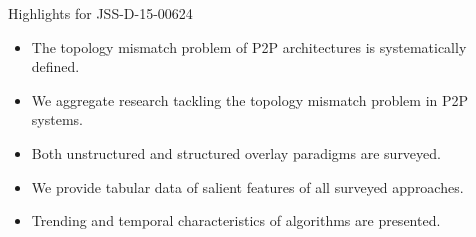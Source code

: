 \documentclass[10pt,letterpaper]{article}
\begin{document}
\vspace*{0.5cm}
\centerline{\large\sf Highlights for JSS-D-15-00624}
\vspace*{0.5cm}
\vspace*{0.5cm}

\begin{itemize}
\item
The topology mismatch problem of P2P architectures is systematically defined.
\item
We aggregate research tackling the topology mismatch problem in P2P systems.
\item
Both unstructured and structured overlay paradigms are surveyed.
\item
We provide tabular data of salient features of all surveyed approaches.
\item
Trending and temporal characteristics of algorithms are presented.
\end{itemize}
\end{document}
